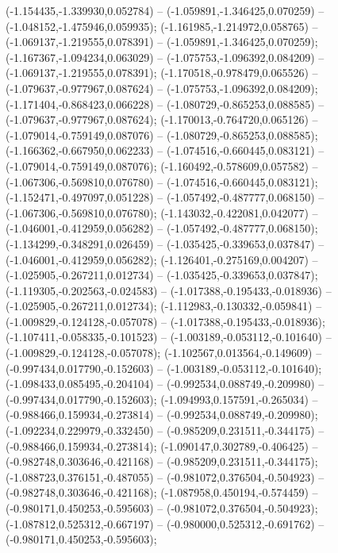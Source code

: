  (-1.154435,-1.339930,0.052784) -- (-1.059891,-1.346425,0.070259) -- (-1.048152,-1.475946,0.059935);
 (-1.161985,-1.214972,0.058765) -- (-1.069137,-1.219555,0.078391) -- (-1.059891,-1.346425,0.070259);
 (-1.167367,-1.094234,0.063029) -- (-1.075753,-1.096392,0.084209) -- (-1.069137,-1.219555,0.078391);
 (-1.170518,-0.978479,0.065526) -- (-1.079637,-0.977967,0.087624) -- (-1.075753,-1.096392,0.084209);
 (-1.171404,-0.868423,0.066228) -- (-1.080729,-0.865253,0.088585) -- (-1.079637,-0.977967,0.087624);
 (-1.170013,-0.764720,0.065126) -- (-1.079014,-0.759149,0.087076) -- (-1.080729,-0.865253,0.088585);
 (-1.166362,-0.667950,0.062233) -- (-1.074516,-0.660445,0.083121) -- (-1.079014,-0.759149,0.087076);
 (-1.160492,-0.578609,0.057582) -- (-1.067306,-0.569810,0.076780) -- (-1.074516,-0.660445,0.083121);
 (-1.152471,-0.497097,0.051228) -- (-1.057492,-0.487777,0.068150) -- (-1.067306,-0.569810,0.076780);
 (-1.143032,-0.422081,0.042077) -- (-1.046001,-0.412959,0.056282) -- (-1.057492,-0.487777,0.068150);
 (-1.134299,-0.348291,0.026459) -- (-1.035425,-0.339653,0.037847) -- (-1.046001,-0.412959,0.056282);
 (-1.126401,-0.275169,0.004207) -- (-1.025905,-0.267211,0.012734) -- (-1.035425,-0.339653,0.037847);
 (-1.119305,-0.202563,-0.024583) -- (-1.017388,-0.195433,-0.018936) -- (-1.025905,-0.267211,0.012734);
 (-1.112983,-0.130332,-0.059841) -- (-1.009829,-0.124128,-0.057078) -- (-1.017388,-0.195433,-0.018936);
 (-1.107411,-0.058335,-0.101523) -- (-1.003189,-0.053112,-0.101640) -- (-1.009829,-0.124128,-0.057078);
 (-1.102567,0.013564,-0.149609) -- (-0.997434,0.017790,-0.152603) -- (-1.003189,-0.053112,-0.101640);
 (-1.098433,0.085495,-0.204104) -- (-0.992534,0.088749,-0.209980) -- (-0.997434,0.017790,-0.152603);
 (-1.094993,0.157591,-0.265034) -- (-0.988466,0.159934,-0.273814) -- (-0.992534,0.088749,-0.209980);
 (-1.092234,0.229979,-0.332450) -- (-0.985209,0.231511,-0.344175) -- (-0.988466,0.159934,-0.273814);
 (-1.090147,0.302789,-0.406425) -- (-0.982748,0.303646,-0.421168) -- (-0.985209,0.231511,-0.344175);
 (-1.088723,0.376151,-0.487055) -- (-0.981072,0.376504,-0.504923) -- (-0.982748,0.303646,-0.421168);
 (-1.087958,0.450194,-0.574459) -- (-0.980171,0.450253,-0.595603) -- (-0.981072,0.376504,-0.504923);
 (-1.087812,0.525312,-0.667197) -- (-0.980000,0.525312,-0.691762) -- (-0.980171,0.450253,-0.595603);
